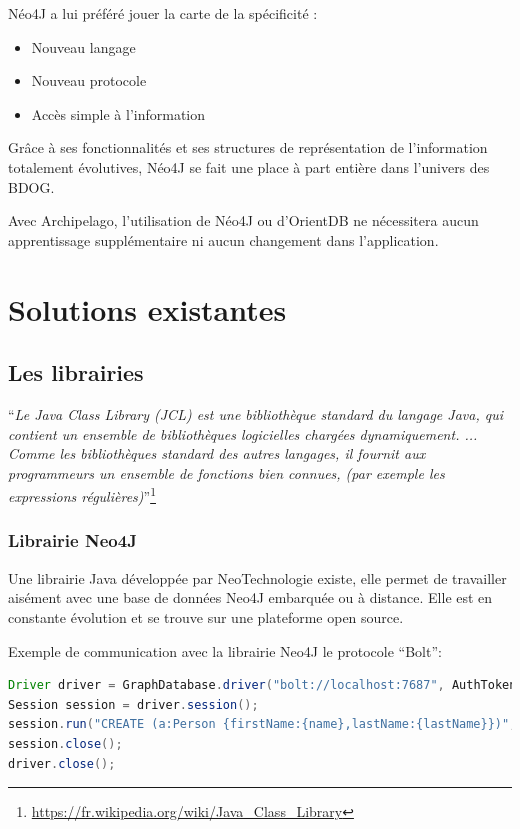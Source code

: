 \documentclass[a4paper,fleqn,12pt,oneside]{report}
\begin{document}
Néo4J a lui préféré jouer la carte de la spécificité :
\begin{itemize}
\item Nouveau langage
\item Nouveau protocole
\item Accès simple à l’information
\end{itemize}
Grâce à ses fonctionnalités et ses structures de représentation de l'information totalement évolutives, Néo4J se fait une place à part entière dans l’univers des BDOG.

Avec Archipelago, l'utilisation de Néo4J ou d'OrientDB ne nécessitera aucun apprentissage supplémentaire ni aucun changement dans l'application.

\chapter{Solutions existantes}

\section{Les librairies} 

\enquote{\textit{Le Java Class Library (JCL) est une bibliothèque standard du langage Java, qui contient un ensemble de bibliothèques logicielles chargées dynamiquement. ... Comme les bibliothèques standard des autres langages, il fournit aux programmeurs un ensemble de fonctions bien connues, (par exemple les expressions régulières)}}\footnote{\url{https://fr.wikipedia.org/wiki/Java_Class_Library}}



\subsection{Librairie Neo4J}

Une librairie Java développée par NeoTechnologie existe, elle permet de travailler aisément avec une base de données Neo4J embarquée ou à distance. Elle est en constante évolution et se trouve sur une plateforme open source. 

Exemple de communication avec la librairie Neo4J le protocole \enquote{Bolt}:
\vspace{0.6cm}
\begin{lstlisting}[language=java]
Driver driver = GraphDatabase.driver("bolt://localhost:7687", AuthTokens.basic("matrix", "neo"));
Session session = driver.session();
session.run("CREATE (a:Person {firstName:{name},lastName:{lastName}})", parameters("firstName","Gilles","lastName","Bodart"));
session.close();
driver.close();

\end{lstlisting}
\end{document}
